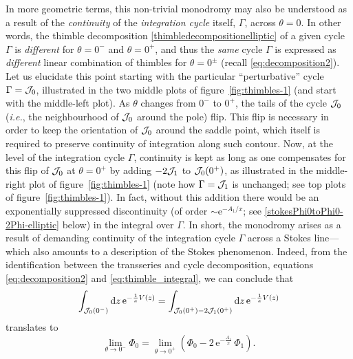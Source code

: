 \documentclass[11pt,a4paper]{article}
\newcommand{\CJ}{{\cal J}}
\newcommand{\be}{\begin{equation}}
\newcommand{\ee}{\end{equation}}
\newcommand{\rme}{{\mathrm{e}}}
\newcommand{\rmd}{{\mathrm{d}}}
\begin{document}
In more geometric terms, this non-trivial monodromy may also be understood as a result of the \textit{continuity} of the \textit{integration cycle} itself, $\Gamma$, across $\theta=0$. In other words, the thimble decomposition \eqref{thimbledecompositionelliptic} of a given cycle $\Gamma$ is \textit{different} for $\theta=0^{-}$ and $\theta=0^{+}$, and thus the \textit{same} cycle $\Gamma$ is expressed as \textit{different} linear combination of thimbles for $\theta=0^{\pm}$ (recall \eqref{eq:decomposition2}). Let us elucidate this point starting with the particular ``perturbative'' cycle $\Gamma=\CJ_0$, illustrated in the two middle plots of figure~\ref{fig:thimbles-1} (and start with the middle-left plot). As $\theta$ changes from $0^-$ to $0^+$, the tails of the cycle $\CJ_0$ (\textit{i.e.}, the neighbourhood of $\CJ_0$ around the pole) flip. This flip is necessary in order to keep the orientation of $\CJ_0$ around the saddle point, which itself is required to preserve continuity of integration along such contour. Now, at the level of the integration cycle $\Gamma$, continuity is kept as long as one compensates for this flip of $\CJ_0$ at $\theta=0^+$ by adding $-2 \CJ_1$ to $\CJ_0 (0^+)$, as illustrated in the middle-right plot of figure~\ref{fig:thimbles-1} (note how $\Gamma = \CJ_1$ is unchanged; see top plots of figure~\ref{fig:thimbles-1}). In fact, without this addition there would be an exponentially suppressed discontinuity (of order $\sim \rme^{-A_1/x}$; see \eqref{stokesPhi0toPhi0-2Phi-elliptic} below) in the integral over $\Gamma$. In short, the monodromy arises as a result of demanding continuity of the integration cycle $\Gamma$ across a Stokes line---which also amounts to a description of the Stokes phenomenon. Indeed, from the identification between the transseries and cycle decomposition, equations  \eqref{eq:decomposition2} and \eqref{eq:thimble_integral}, we can conclude that
%
\be
\int_{\CJ_0 (0^-)} \rmd z\, \rme^{-\frac{1}{x} V(z)} = \int_{\CJ_0 (0^+) - 2\CJ_1 (0^+)} \rmd z\, \rme^{-\frac{1}{x}V(z)}
\ee
%
\noindent
translates to
%
\be
\label{stokesPhi0toPhi0-2Phi-elliptic}
\lim_{\theta \to 0^-} \Phi_0 = \lim_{\theta \to 0^+} \left( \Phi_0 - 2\, \rme^{-\frac{A_1}{x}}\, \Phi_1 \right).
\ee
\end{document}
